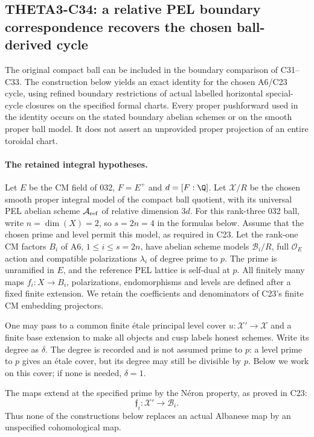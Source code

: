 \subsection{THETA3-C34: a relative PEL boundary correspondence recovers the chosen ball-derived cycle}\label{C34}

The original compact ball can be included in the boundary
comparison of C31--C33. The construction below yields an
exact identity for the chosen A6/C23 cycle, using refined
boundary restrictions of actual labelled horizontal
special-cycle closures on the specified formal charts. Every proper pushforward used in
the identity occurs on the stated boundary abelian schemes
or on the smooth proper ball model. It does not assert an
unprovided proper projection of an entire toroidal chart.

\paragraph{The retained integral hypotheses.}
Let $E$ be the CM field of 032, $F=E^+$ and
$d=[F:\Q]$. Let $\mathcal X/R$ be the chosen smooth
proper integral model of the compact ball quotient,
with its universal PEL abelian scheme
$\mathcal A_{\rm ref}$ of relative dimension $3d$.
For this rank-three 032 ball, write
$n=\dim(X)=2$, so $s=2n=4$ in the formulas below.
Assume that the chosen prime and level permit this
model, as required in C23. Let the rank-one CM
factors $B_i$ of A6, $1\leq i\leq s=2n$, have
abelian scheme models $\mathcal B_i/R$, full
$\mathcal O_E$ action and compatible polarizations
$\lambda_i$ of degree prime to $p$. The prime is
unramified in $E$, and the reference PEL lattice is
self-dual at $p$. All finitely many maps
$f_i:X\to B_i$, polarizations, endomorphisms and
levels are defined after a fixed finite extension.
We retain the coefficients and denominators of
C23's finite CM embedding projectors.

One may pass to a common finite \'etale principal
level cover $u:\mathcal X'\to\mathcal X$ and a
finite base extension to make all objects and cusp
labels honest schemes. Write its degree as
$\delta$. The degree is recorded and is not
assumed prime to $p$: a level prime to $p$ gives
an \'etale cover, but its degree may still be
divisible by $p$. Below we work on this cover;
if none is needed, $\delta=1$.

The maps extend at the specified prime by the
N\'eron property, as proved in C23:
\[
        \mathfrak f_i:\mathcal X'\longrightarrow\mathcal B_i.
                                                        \tag{C34a}
\]
Thus none of the constructions below replaces
an actual Albanese map by an unspecified
cohomological map.

